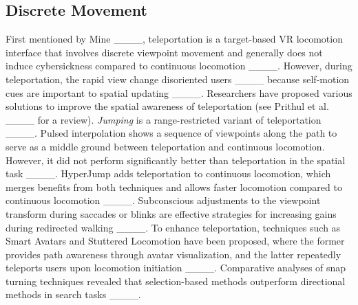 \subsection{Discrete Movement}
First mentioned by Mine ____, teleportation is a target-based VR locomotion interface that involves discrete viewpoint movement and generally does not induce cybersickness compared to continuous locomotion ____.
However, during teleportation, the rapid view change disoriented users ____ because self-motion cues are important to spatial updating ____.
Researchers have proposed various solutions to improve the spatial awareness of teleportation (see Prithul et al. ____ for a review).
\textit{Jumping} is a range-restricted variant of teleportation ____. Pulsed interpolation shows a sequence of viewpoints along the path to serve as a middle ground between teleportation and continuous locomotion. However, it did not perform significantly better than teleportation in the spatial task ____.
HyperJump adds teleportation to continuous locomotion, which merges benefits from both techniques and allows faster locomotion compared to continuous locomotion ____. 
Subconscious adjustments to the viewpoint transform during saccades or blinks are effective strategies for increasing gains during redirected walking ____. To enhance teleportation, techniques such as Smart Avatars and Stuttered Locomotion have been proposed, where the former provides path awareness through avatar visualization, and the latter repeatedly teleports users upon locomotion initiation ____. Comparative analyses of snap turning techniques revealed that selection-based methods outperform directional methods in search tasks ____.



